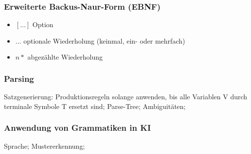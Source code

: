 \documentclass[german,color,6pt]{latex4ei/latex4ei_sheet}
\begin{document}
\begin{sectionbox}
	\subsubsection{Erweiterte Backus-Naur-Form (EBNF)}
	\begin{itemize}
		\item $[\dots]$ Option
		\item ${\dots}$ optionale Wiederholung (keinmal, ein- oder mehrfach)
		\item $n*$ abgezählte Wiederholung
	\end{itemize}

	\subsubsection{Parsing}
	Satzgenerierung: Produktionsregeln solange anwenden, bis alle Variablen V durch terminale Symbole T ersetzt sind; Parse-Tree; Ambiguitäten;

	\subsubsection{Anwendung von Grammatiken in KI}
	Sprache; Mustererkennung;
\end{sectionbox}
\end{document}
